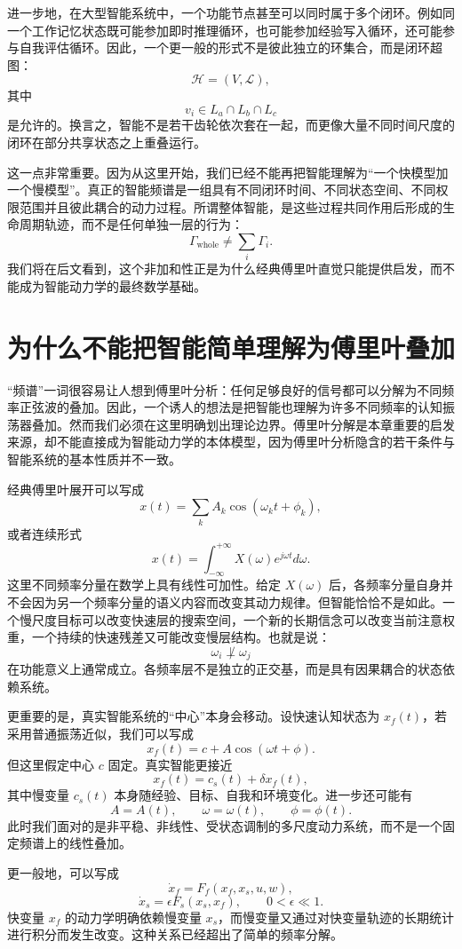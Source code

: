 进一步地，在大型智能系统中，一个功能节点甚至可以同时属于多个闭环。例如同一个工作记忆状态既可能参加即时推理循环，也可能参加经验写入循环，还可能参与自我评估循环。因此，一个更一般的形式不是彼此独立的环集合，而是闭环超图：
\[
\mathcal{H}
=
\left(
V,
\mathcal{L}
\right),
\]
其中
\[
v_i
\in
L_a
\cap
L_b
\cap
L_c
\]
是允许的。换言之，智能不是若干齿轮依次套在一起，而更像大量不同时间尺度的闭环在部分共享状态之上重叠运行。

这一点非常重要。因为从这里开始，我们已经不能再把智能理解为“一个快模型加一个慢模型”。真正的智能频谱是一组具有不同闭环时间、不同状态空间、不同权限范围并且彼此耦合的动力过程。所谓整体智能，是这些过程共同作用后形成的生命周期轨迹，而不是任何单独一层的行为：
\[
\Gamma_{\mathrm{whole}}
\neq
\sum_i
\Gamma_i.
\]
我们将在后文看到，这个非加和性正是为什么经典傅里叶直觉只能提供启发，而不能成为智能动力学的最终数学基础。

\section{为什么不能把智能简单理解为傅里叶叠加}

“频谱”一词很容易让人想到傅里叶分析：任何足够良好的信号都可以分解为不同频率正弦波的叠加。因此，一个诱人的想法是把智能也理解为许多不同频率的认知振荡器叠加。然而我们必须在这里明确划出理论边界。傅里叶分解是本章重要的启发来源，却不能直接成为智能动力学的本体模型，因为傅里叶分析隐含的若干条件与智能系统的基本性质并不一致。

经典傅里叶展开可以写成
\[
x(t)
=
\sum_k
A_k
\cos
\left(
\omega_k t+\phi_k
\right),
\]
或者连续形式
\[
x(t)
=
\int_{-\infty}^{+\infty}
X(\omega)
e^{j\omega t}
d\omega.
\]
这里不同频率分量在数学上具有线性可加性。给定 $X(\omega)$ 后，各频率分量自身并不会因为另一个频率分量的语义内容而改变其动力规律。但智能恰恰不是如此。一个慢尺度目标可以改变快速层的搜索空间，一个新的长期信念可以改变当前注意权重，一个持续的快速残差又可能改变慢层结构。也就是说：
\[
\omega_i
\not\perp
\omega_j
\]
在功能意义上通常成立。各频率层不是独立的正交基，而是具有因果耦合的状态依赖系统。

更重要的是，真实智能系统的“中心”本身会移动。设快速认知状态为 $x_f(t)$，若采用普通振荡近似，我们可以写成
\[
x_f(t)
=
c+
A\cos(\omega t+\phi).
\]
但这里假定中心 $c$ 固定。真实智能更接近
\[
x_f(t)
=
c_s(t)
+
\delta x_f(t),
\]
其中慢变量 $c_s(t)$ 本身随经验、目标、自我和环境变化。进一步还可能有
\[
A=A(t),\qquad
\omega=\omega(t),\qquad
\phi=\phi(t).
\]
此时我们面对的是非平稳、非线性、受状态调制的多尺度动力系统，而不是一个固定频谱上的线性叠加。

更一般地，可以写成
\[
\dot{x}_f
=
F_f
\left(
x_f,
x_s,
u,
w
\right),
\]
\[
\dot{x}_s
=
\epsilon
F_s
\left(
x_s,
x_f
\right),
\qquad
0<\epsilon\ll1.
\]
快变量 $x_f$ 的动力学明确依赖慢变量 $x_s$，而慢变量又通过对快变量轨迹的长期统计进行积分而发生改变。这种关系已经超出了简单的频率分解。

